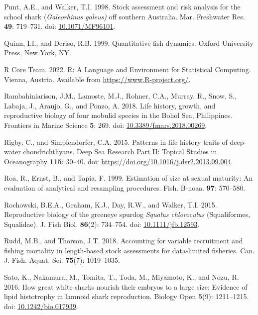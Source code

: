 \documentclass[
]{article}
\newenvironment{CSLReferences}%
  {}%
  {\par}
\begin{document}
\begin{CSLReferences}{1}{0}
Punt, A.E., and Walker, T.I. 1998. Stock assessment and risk analysis for the school shark (\emph{{Galeorhinus} galeus)} off southern {Australia}. Mar. Freshwater Res. \textbf{49}: 719--731. doi: \href{https://doi.org/10.1071/MF96101}{10.1071/MF96101}.

Quinn, I.I., and Deriso, R.B. 1999. Quantitative fish dynamics. Oxford University Press, New York, NY.

R Core Team. 2022. R: {A} {Language} and {Environment} for {Statistical} {Computing}. Vienna, Austria. Available from \url{https://www.R-project.org/}.

Rambahiniarison, J.M., Lamoste, M.J., Rohner, C.A., Murray, R., Snow, S., Labaja, J., Araujo, G., and Ponzo, A. 2018. Life history, growth, and reproductive biology of four mobulid species in the {Bohol} {Sea}, {Philippines}. Frontiers in Marine Science \textbf{5}: 269. doi: \href{https://doi.org/10.3389/fmars.2018.00269}{10.3389/fmars.2018.00269}.

Rigby, C., and Simpfendorfer, C.A. 2015. Patterns in life history traits of deep-water chondrichthyans. Deep Sea Research Part II: Topical Studies in Oceanography \textbf{115}: 30--40. doi: \url{https://doi.org/10.1016/j.dsr2.2013.09.004}.

Roa, R., Ernst, B., and Tapia, F. 1999. Estimation of size at sexual maturity: An evaluation of analytical and resampling procedures. Fish. B-noaa. \textbf{97}: 570--580.

Rochowski, B.E.A., Graham, K.J., Day, R.W., and Walker, T.I. 2015. Reproductive biology of the greeneye spurdog \emph{{Squalus} chloroculus} ({Squaliformes}, {Squalidae}). J. Fish Biol. \textbf{86}(2): 734--754. doi: \href{https://doi.org/10.1111/jfb.12593}{10.1111/jfb.12593}.

Rudd, M.B., and Thorson, J.T. 2018. Accounting for variable recruitment and fishing mortality in length-based stock assessments for data-limited fisheries. Can. J. Fish. Aquat. Sci. \textbf{75}(7): 1019--1035.

Sato, K., Nakamura, M., Tomita, T., Toda, M., Miyamoto, K., and Nozu, R. 2016. How great white sharks nourish their embryos to a large size: Evidence of lipid histotrophy in lamnoid shark reproduction. Biology Open \textbf{5}(9): 1211--1215. doi: \href{https://doi.org/10.1242/bio.017939}{10.1242/bio.017939}.


\end{CSLReferences}
\end{document}

